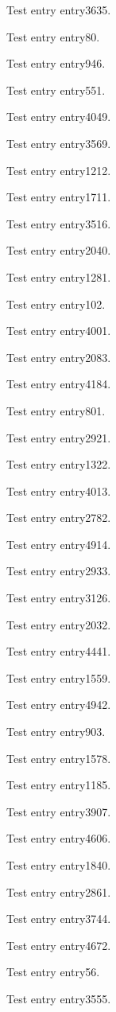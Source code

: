 Test entry \gls{entry3635}.

Test entry \gls{entry80}.

Test entry \gls{entry946}.

Test entry \gls{entry551}.

Test entry \gls{entry4049}.

Test entry \gls{entry3569}.

Test entry \gls{entry1212}.

Test entry \gls{entry1711}.

Test entry \gls{entry3516}.

Test entry \gls{entry2040}.

Test entry \gls{entry1281}.

Test entry \gls{entry102}.

Test entry \gls{entry4001}.

Test entry \gls{entry2083}.

Test entry \gls{entry4184}.

Test entry \gls{entry801}.

Test entry \gls{entry2921}.

Test entry \gls{entry1322}.

Test entry \gls{entry4013}.

Test entry \gls{entry2782}.

Test entry \gls{entry4914}.

Test entry \gls{entry2933}.

Test entry \gls{entry3126}.

Test entry \gls{entry2032}.

Test entry \gls{entry4441}.

Test entry \gls{entry1559}.

Test entry \gls{entry4942}.

Test entry \gls{entry903}.

Test entry \gls{entry1578}.

Test entry \gls{entry1185}.

Test entry \gls{entry3907}.

Test entry \gls{entry4606}.

Test entry \gls{entry1840}.

Test entry \gls{entry2861}.

Test entry \gls{entry3744}.

Test entry \gls{entry4672}.

Test entry \gls{entry56}.

Test entry \gls{entry3555}.

